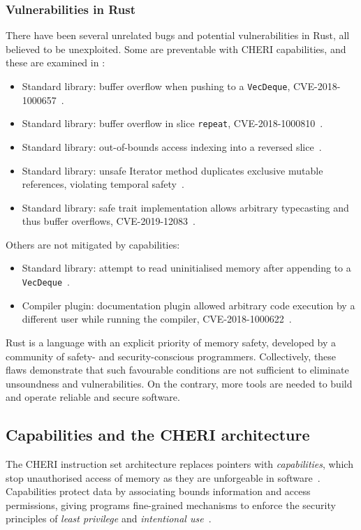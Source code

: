 \documentclass[dissertation.tex]{subfiles}
\begin{document}
\subsubsection{Vulnerabilities in Rust}
There have been several unrelated bugs and potential vulnerabilities in
Rust, all believed to be unexploited.
Some are preventable with CHERI capabilities, and these are examined in
:

\begin{itemize}
    \item Standard library: buffer overflow when pushing to a
    \texttt{VecDeque}, CVE-2018-1000657~\cite{cve-push,rust-issue-push}.
    \item Standard library: buffer overflow in slice \texttt{repeat},
    CVE-2018-1000810~\cite{cve-repeat,rust-advisory-repeat,rust-pr-slice}.
    \item Standard library: out-of-bounds access indexing into a
    reversed slice~\cite{rust-pr-reverse,rust-commit-reverse}.
    \item Standard library: unsafe Iterator method duplicates
    exclusive mutable references, violating temporal
    safety~\cite{rust-issue-vec-mut}.
    \item Standard library: safe trait implementation allows arbitrary
    typecasting and thus buffer overflows,
    CVE-2019-12083~\cite{cve-cast,rust-advisory-cast}.
\end{itemize}

Others are not mitigated by capabilities:

\begin{itemize}
    \item Standard library: attempt to read uninitialised memory after
    appending to a \texttt{VecDeque}~\cite{rust-issue-deque-append}.
    \item Compiler plugin: documentation plugin allowed arbitrary code
    execution by a different user while running the
    compiler, CVE-2018-1000622~\cite{cve-rustdoc,rust-advisory-rustdoc}.
\end{itemize}

Rust is a language with an explicit priority of memory safety, developed
by a community of safety- and security-conscious programmers.
Collectively, these flaws demonstrate that such favourable conditions
are not sufficient to eliminate unsoundness and vulnerabilities.
On the contrary, more tools are needed to build and operate reliable and
secure software.


\subsection{Capabilities and the CHERI architecture}
The CHERI instruction set architecture replaces pointers with
\emph{capabilities}, which stop unauthorised access of memory as they are
unforgeable in software~\cite{cheri-v6}.
Capabilities protect data by associating bounds information and access
permissions, giving programs fine-grained mechanisms to enforce the
security principles of \emph{least privilege} and \emph{intentional
use}~\cite{neumann-principles}.
\end{document}

